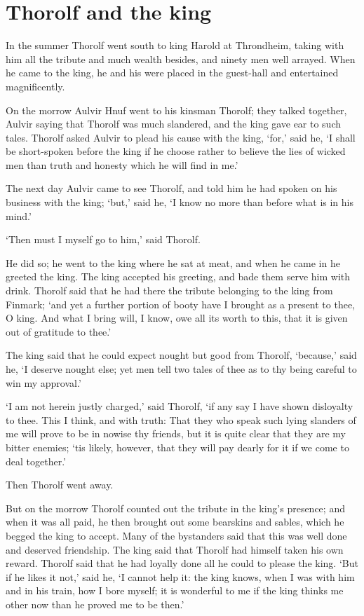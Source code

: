 \chapter{Thorolf and the king}
In the summer Thorolf went south to king Harold at Throndheim, taking with him all the tribute and much wealth besides, and ninety men well arrayed. When he came to the king, he and his were placed in the guest-hall and entertained magnificently.

On the morrow Aulvir Hnuf went to his kinsman Thorolf; they talked together, Aulvir saying that Thorolf was much slandered, and the king gave ear to such tales. Thorolf asked Aulvir to plead his cause with the king, `for,' said he, `I shall be short-spoken before the king if he choose rather to believe the lies of wicked men than truth and honesty which he will find in me.'

The next day Aulvir came to see Thorolf, and told him he had spoken on his business with the king; `but,' said he, `I know no more than before what is in his mind.'

`Then must I myself go to him,' said Thorolf.

He did so; he went to the king where he sat at meat, and when he came in he greeted the king. The king accepted his greeting, and bade them serve him with drink. Thorolf said that he had there the tribute belonging to the king from Finmark; `and yet a further portion of booty have I brought as a present to thee, O king. And what I bring will, I know, owe all its worth to this, that it is given out of gratitude to thee.'

The king said that he could expect nought but good from Thorolf, `because,' said he, `I deserve nought else; yet men tell two tales of thee as to thy being careful to win my approval.'

`I am not herein justly charged,' said Thorolf, `if any say I have shown disloyalty to thee. This I think, and with truth: That they who speak such lying slanders of me will prove to be in nowise thy friends, but it is quite clear that they are my bitter enemies; `tis likely, however, that they will pay dearly for it if we come to deal together.'

Then Thorolf went away.

But on the morrow Thorolf counted out the tribute in the king's presence; and when it was all paid, he then brought out some bearskins and sables, which he begged the king to accept. Many of the bystanders said that this was well done and deserved friendship. The king said that Thorolf had himself taken his own reward. Thorolf said that he had loyally done all he could to please the king. `But if he likes it not,' said he, `I cannot help it: the king knows, when I was with him and in his train, how I bore myself; it is wonderful to me if the king thinks me other now than he proved me to be then.'

